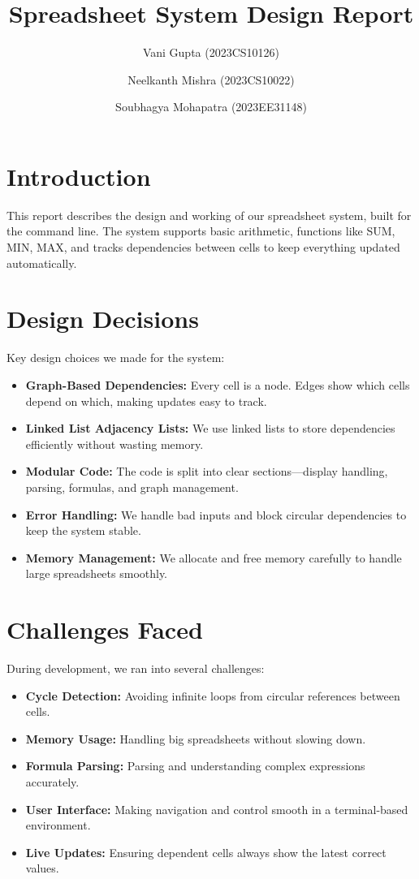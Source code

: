 \documentclass{article}
\title{Spreadsheet System Design Report}
\author{Vani Gupta (2023CS10126) \and Neelkanth Mishra (2023CS10022) \and Soubhagya Mohapatra (2023EE31148)}
\begin{document}
\maketitle

\section{Introduction}
This report describes the design and working of our spreadsheet system, built for the command line. The system supports basic arithmetic, functions like SUM, MIN, MAX, and tracks dependencies between cells to keep everything updated automatically.

\section{Design Decisions}
Key design choices we made for the system:
\begin{itemize}
    \item \textbf{Graph-Based Dependencies:} Every cell is a node. Edges show which cells depend on which, making updates easy to track.
    \item \textbf{Linked List Adjacency Lists:} We use linked lists to store dependencies efficiently without wasting memory.
    \item \textbf{Modular Code:} The code is split into clear sections—display handling, parsing, formulas, and graph management.
    \item \textbf{Error Handling:} We handle bad inputs and block circular dependencies to keep the system stable.
    \item \textbf{Memory Management:} We allocate and free memory carefully to handle large spreadsheets smoothly.
\end{itemize}

\section{Challenges Faced}
During development, we ran into several challenges:
\begin{itemize}
    \item \textbf{Cycle Detection:} Avoiding infinite loops from circular references between cells.
    \item \textbf{Memory Usage:} Handling big spreadsheets without slowing down.
    \item \textbf{Formula Parsing:} Parsing and understanding complex expressions accurately.
    \item \textbf{User Interface:} Making navigation and control smooth in a terminal-based environment.
    \item \textbf{Live Updates:} Ensuring dependent cells always show the latest correct values.
\end{itemize}
\end{document}
